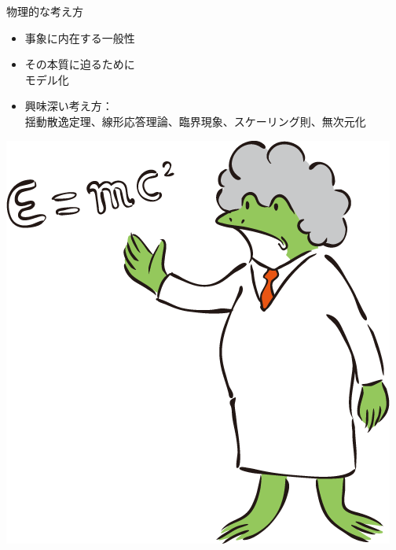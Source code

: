 \documentclass[unicode,12pt]{beamer}%
\begin{document}
\begin{frame}
\begin{columns}[T, onlytextwidth]
        \begin{exampleblock}{物理的な考え方}
            \begin{itemize}
                \item 事象に内在する一般性
                \item その本質に迫るために\\モデル化
                \item 興味深い考え方：\\
                揺動散逸定理、線形応答理論、臨界現象、スケーリング則、無次元化
            \end{itemize}

            \centering
            \includegraphics[width=.32\textwidth]{phys_frog.png}
        \end{exampleblock}  
    \end{columns}
\end{frame}

\end{document}
